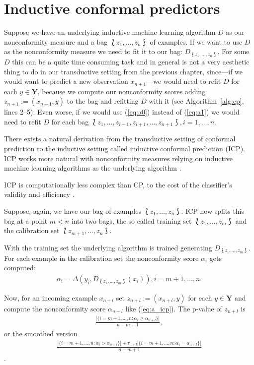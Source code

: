 \documentclass[twoside,11pt]{article}
\begin{document}
\section{Inductive conformal predictors}
\label{sec:icp}

Suppose we have an underlying inductive machine learning
algorithm $D$ as our nonconformity measure and a bag
$\Lbag z_1,\dots,z_n \Rbag$ of examples. If we want to use
$D$ as the nonconformity measure we need to fit it to our
bag: $D_{\Lbag z_1,\dots,z_n \Rbag}$. For some $D$ this can
be a quite time consuming task and in general is not a very
aesthetic thing to do in our transductive setting from the
previous chapter, since---if we would want to predict a
new observation $x_{n+1}$---we would need to refit $D$ for
each $y \in \textbf{Y}$, because we compute our
nonconformity scores adding $z_{n+1} := (x_{n+1},y)$ to
the bag and refitting $D$ with it
(see Algorithm~\ref{alg:cp}, lines 2--5).
Even worse, if we would use (\ref{eq:a0}) instead of
(\ref{eq:a1}) we would need to refit $D$ for each bag
$\Lbag z_1,\dots,z_{i-1},z_{i+1},\dots,z_{n+1} \Rbag,
i=1,\dots,n$.

There exists a natural derivation from the transductive
setting of conformal prediction to the inductive setting
called inductive conformal prediction (ICP).
ICP works more natural with nonconformity measures relying
on inductive machine learning algorithms as the underlying
algorithm \citep[see][Chapter 4]{alrw}.

ICP is computationally less complex than CP, to the cost of
the classifier's validity and efficiency
\citep[see][Chapter 4]{alrw}.

Suppose, again, we have our bag of examples
$\Lbag z_1,\dots,z_n \Rbag$. ICP now splits this bag at a
point $m < n$ into two bags, the so called training set
$\Lbag z_1,\dots,z_m \Rbag$ and the calibration set
$\Lbag z_{m+1},\dots,z_n \Rbag$.

With the training set the underlying algorithm is trained
generating $D_{\Lbag z_1,\dots,z_m \Rbag}$. For each
example in the calibration set the nonconformity score
$\alpha_i$ gets computed:
\begin{align}
  \label{eq:a_icp}
  \alpha_i=\Delta(y_i,D_{\Lbag z_1,\dots,z_m \Rbag}(x_i)),
  i=m+1,\dots,n.
\end{align}

Now, for an incoming example $x_{n+l}$ set
$z_{n+l} := (x_{n+l}, y)$ for each $y \in \textbf{Y}$ and
compute the nonconformity score $\alpha_{n+l}$
like (\ref{eq:a_icp}).
The p-value of $z_{n+l}$ is
\begin{align*}
  \frac{|\{i = m+1,\dots,n: \alpha_i \geq \alpha_{n+l}\}|}
       {n-m+1},
\end{align*}
or the smoothed version
\begin{align*}
  \frac{|\{i=m+1,\dots,n: \alpha_i > \alpha_{n+l}\}|
        + \tau_{n+l}
        |\{i=m+1,\dots,n: \alpha_i = \alpha_{n+l}\}|}
       {n-m+1}
\end{align*}
\citep[see][]{papadopoulos_et_al_2007}.
\end{document}

